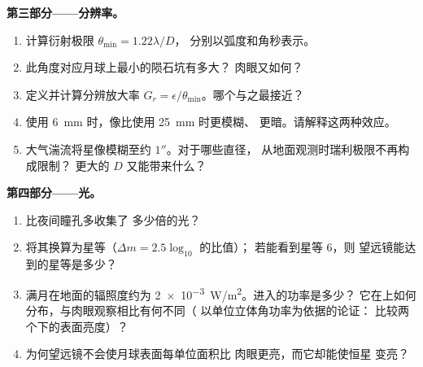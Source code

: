 \begin{problem}
\medskip
\noindent\textbf{第三部分——分辨率。}
\begin{enumerate}[resume]
  \item 计算衍射极限 $\theta_{\min} = 1.22\lambda/D$，
        分别以弧度和角秒表示。
  \item 此角度对应月球上最小的陨石坑有多大？
        肉眼又如何？
  \item 定义并计算分辨放大率 $G_r =
        \epsilon/\theta_{\min}$。哪个与之最接近？
  \item 使用 \qty{6}{mm} 时，像比使用 \qty{25}{mm} 时更模糊、
        更暗。请解释这两种效应。
  \item 大气湍流将星像模糊至约 $1''$。对于哪些直径，
        从地面观测时瑞利极限不再构成限制？
        更大的 $D$ 又能带来什么？
\end{enumerate}

\medskip
\noindent\textbf{第四部分——光。}
\begin{enumerate}[resume]
  \item {}比夜间瞳孔多收集了
        多少倍的光？
  \item 将其换算为星等（$\Delta m = 2.5\log_{10}$ 的比值）；
        若能看到星等 $6$，则
        望远镜能达到的星等是多少？
  \item 满月在地面的辐照度约为
        \qty{2e-3}{W/m^2}。进入的功率是多少？
        它在上如何分布，与肉眼观察相比有何不同（
        以单位立体角功率为依据的论证：
        比较两个下的表面亮度）？
  \item 为何望远镜不会使月球表面每单位面积比
        肉眼更亮，而它却能使恒星
        变亮？
\end{enumerate}


\end{problem}
